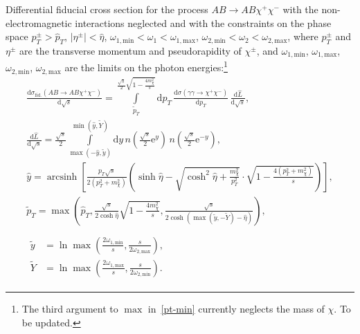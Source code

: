 \documentclass[a4paper,12pt]{article}
\newcommand{\abs}[1]{\lvert #1 \rvert}
\DeclareMathOperator{\arcsinh}{arcsinh}
\begin{document}
Differential fiducial cross section for the process $AB \to AB \chi^+ \chi^-$
with the non-electromagnetic interactions neglected and with the constraints on
the phase space $p_T^\pm > \hat p_T$, $\abs{\eta^\pm} < \hat \eta$, $\omega_{1,
\text{min}} < \omega_1 < \omega_{1, \text{max}}$, $\omega_{2, \text{min}} <
\omega_2 < \omega_{2, \text{max}}$, where $p_T^\pm$ and $\eta^\pm$ are the
transverse momentum and pseudorapidity of $\chi^\pm$, and $\omega_{1,
\text{min}}$, $\omega_{1, \text{max}}$, $\omega_{2, \text{min}}$, $\omega_{2,
\text{max}}$ are the limits on the photon energies:\footnote{The third argument
to $\max$ in~\eqref{pt-min} currently neglects the mass of $\chi$. To be
updated.}
\begin{gather}
  \frac{\mathrm{d} \sigma_\text{fid.}(AB \to AB \chi^+ \chi^-)}
       {\mathrm{d} \sqrt{s}}
  = \int\limits_{\tilde p_T}
               ^{\frac{\sqrt{s}}{2} \sqrt{1 - \frac{4 m_\chi^2}{s}}}
      \mathrm{d} p_T
      \, \frac{\mathrm{d} \sigma(\gamma \gamma \to \chi^+ \chi^-)}
              {\mathrm{d} p_T}
      \, \frac{\mathrm{d} \hat L}{\mathrm{d} \sqrt{s}},
  \\
  \frac{\mathrm{d} \hat L}{\mathrm{d} \sqrt{s}}
  = \frac{\sqrt{s}}{2}
    \int\limits_{\max(-\hat y, \tilde y)}^{\min(\hat y, \tilde Y)} \mathrm{d} y
    \, n \left( \frac{\sqrt{s}}{2} \mathrm{e}^y \right)
    \, n \left( \frac{\sqrt{s}}{2} \mathrm{e}^{-y} \right),
  \\
  \hat y = \arcsinh \left[
    \frac{p_T \sqrt{s}}{2 (p_T^2 + m_\chi^2)} \left(
      \sinh \hat \eta
      - \sqrt{\cosh^2 \hat \eta + \frac{m_\chi^2}{p_T^2}}
        \cdot \sqrt{1 - \frac{4 (p_T^2 + m_\chi^2)}{s}}
    \right)
  \right],
  \\
  \tilde p_T
  = \max \left(
      \hat p_T,
      \frac{\sqrt{s}}{2 \cosh \hat \eta} \sqrt{1 - \frac{4 m_\chi^2}{s}},
      \frac{\sqrt{s}}{2 \cosh(\max(\tilde y, -\tilde Y) - \hat \eta)}
    \right),
    \label{pt-min}
  \\
  \begin{aligned}
    \\
    \tilde y
    &= \ln \max \left(
         \frac{2 \omega_{1, \text{min}}}{s}, \frac{s}{2 \omega_{2, \text{max}}}
       \right),
    \\
    \tilde Y
    &= \ln \max \left(
         \frac{2 \omega_{1, \text{max}}}{s}, \frac{s}{2 \omega_{2, \text{min}}}
       \right).
  \end{aligned}
\end{gather}
\end{document}
